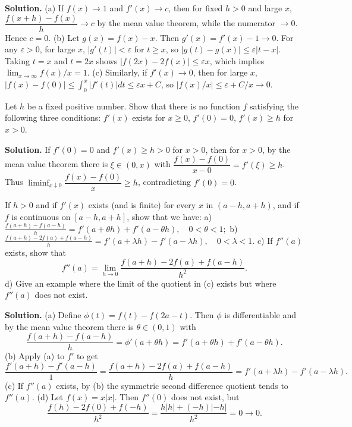 \noindent\textbf{Solution.}
(a) If $f(x)\to 1$ and $f'(x)\to c$, then for fixed $h>0$ and large $x$, $\dfrac{f(x+h)-f(x)}{h}\to c$ by the mean value theorem, while the numerator $\to 0$. Hence $c=0$. (b) Let $g(x)=f(x)-x$. Then $g'(x)=f'(x)-1\to 0$. For any $\varepsilon>0$, for large $x$, $|g'(t)|<\varepsilon$ for $t\ge x$, so $|g(t)-g(x)|\le \varepsilon|t-x|$. Taking $t=x$ and $t=2x$ shows $|f(2x)-2f(x)|\le \varepsilon x$, which implies $\lim_{x\to\infty}f(x)/x=1$. (c) Similarly, if $f'(x)\to 0$, then for large $x$, $|f(x)-f(0)|\le \int_0^x|f'(t)|dt\le \varepsilon x+C$, so $|f(x)/x|\le \varepsilon+C/x\to 0$.

\begin{problembox}
Let \( h \) be a fixed positive number. Show that there is no function \( f \) satisfying the following three conditions: \( f'(x) \) exists for \( x \geq 0 \), \( f'(0) = 0 \), \( f'(x) \geq h \) for \( x > 0 \).
\end{problembox}

\noindent\textbf{Solution.}
If $f'(0)=0$ and $f'(x)\ge h>0$ for $x>0$, then for $x>0$, by the mean value theorem there is $\xi\in(0,x)$ with $\dfrac{f(x)-f(0)}{x-0}=f'(\xi)\ge h$. Thus $\liminf_{x\downarrow 0}\dfrac{f(x)-f(0)}{x}\ge h$, contradicting $f'(0)=0$.

\begin{problembox}
If \( h > 0 \) and if \( f'(x) \) exists (and is finite) for every \( x \) in \( (a - h, a + h) \), and if \( f \) is continuous on \( [a - h, a + h] \), show that we have:
a) \( \frac{f(a + h) - f(a - h)}{h} = f'(a + \theta h) + f'(a - \theta h), \quad 0 < \theta < 1; \)
b) \( \frac{f(a + h) - 2f(a) + f(a - h)}{h} = f'(a + \lambda h) - f'(a - \lambda h), \quad 0 < \lambda < 1. \)
c) If \( f''(a) \) exists, show that
\[ f''(a) = \lim_{h \to 0} \frac{f(a + h) - 2f(a) + f(a - h)}{h^2}. \]
d) Give an example where the limit of the quotient in (c) exists but where \( f''(a) \) does not exist.
\end{problembox}

\noindent\textbf{Solution.}
(a) Define $\phi(t)=f(t)-f(2a-t)$. Then $\phi$ is differentiable and by the mean value theorem there is $\theta\in(0,1)$ with
\[\frac{f(a+h)-f(a-h)}{h}=\phi'(a+\theta h)=f'(a+\theta h)+f'(a-\theta h).\]
(b) Apply (a) to $f'$ to get
\[\frac{f'(a+h)-f'(a-h)}{1}=\frac{f(a+h)-2f(a)+f(a-h)}{h}=f'(a+\lambda h)-f'(a-\lambda h).\]
(c) If $f''(a)$ exists, by (b) the symmetric second difference quotient tends to $f''(a)$. (d) Let $f(x)=x|x|$. Then $f''(0)$ does not exist, but
\[\frac{f(h)-2f(0)+f(-h)}{h^2}=\frac{h|h|+(-h)|-h|}{h^2}=0\to 0.\]

